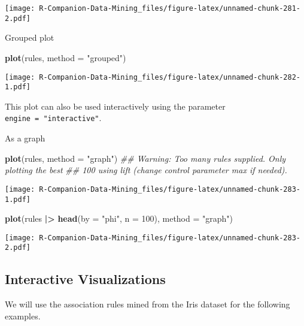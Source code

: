 \documentclass[
  notitlepage]{book}
\newenvironment{Shaded}{\begin{snugshade}}{\end{snugshade}}
\newcommand{\CommentTok}[1]{\textcolor[rgb]{0.56,0.35,0.01}{\textit{#1}}}
\newcommand{\DataTypeTok}[1]{\textcolor[rgb]{0.13,0.29,0.53}{#1}}
\newcommand{\DecValTok}[1]{\textcolor[rgb]{0.00,0.00,0.81}{#1}}
\newcommand{\ErrorTok}[1]{\textcolor[rgb]{0.64,0.00,0.00}{\textbf{#1}}}
\newcommand{\KeywordTok}[1]{\textcolor[rgb]{0.13,0.29,0.53}{\textbf{#1}}}
\newcommand{\NormalTok}[1]{#1}
\newcommand{\OperatorTok}[1]{\textcolor[rgb]{0.81,0.36,0.00}{\textbf{#1}}}
\newcommand{\StringTok}[1]{\textcolor[rgb]{0.31,0.60,0.02}{#1}}
\begin{document}
\texttt{[image: R-Companion-Data-Mining\_files/figure-latex/unnamed-chunk-281-2.pdf]}

Grouped plot

\begin{Shaded}
\begin{Highlighting}[]
\KeywordTok{plot}\NormalTok{(rules, }\DataTypeTok{method =} \StringTok{"grouped"}\NormalTok{)}
\end{Highlighting}
\end{Shaded}

\texttt{[image: R-Companion-Data-Mining\_files/figure-latex/unnamed-chunk-282-1.pdf]}

This plot can also be used interactively using the parameter
\texttt{engine\ =\ "interactive"}.

As a graph

\begin{Shaded}
\begin{Highlighting}[]
\KeywordTok{plot}\NormalTok{(rules, }\DataTypeTok{method =} \StringTok{"graph"}\NormalTok{)}
\CommentTok{\#\# Warning: Too many rules supplied. Only plotting the best}
\CommentTok{\#\# 100 using \textquotesingle{}lift\textquotesingle{} (change control parameter max if needed).}
\end{Highlighting}
\end{Shaded}

\texttt{[image: R-Companion-Data-Mining\_files/figure-latex/unnamed-chunk-283-1.pdf]}

\begin{Shaded}
\begin{Highlighting}[]
\KeywordTok{plot}\NormalTok{(rules }\OperatorTok{|}\ErrorTok{\textgreater{}}\StringTok{ }\KeywordTok{head}\NormalTok{(}\DataTypeTok{by =} \StringTok{"phi"}\NormalTok{, }\DataTypeTok{n =} \DecValTok{100}\NormalTok{), }\DataTypeTok{method =} \StringTok{"graph"}\NormalTok{)}
\end{Highlighting}
\end{Shaded}

\texttt{[image: R-Companion-Data-Mining\_files/figure-latex/unnamed-chunk-283-2.pdf]}

\hypertarget{interactive-visualizations}{%
\subsection{Interactive Visualizations}\label{interactive-visualizations}}

We will use the association rules mined from the Iris dataset for the
following examples.
\end{document}
